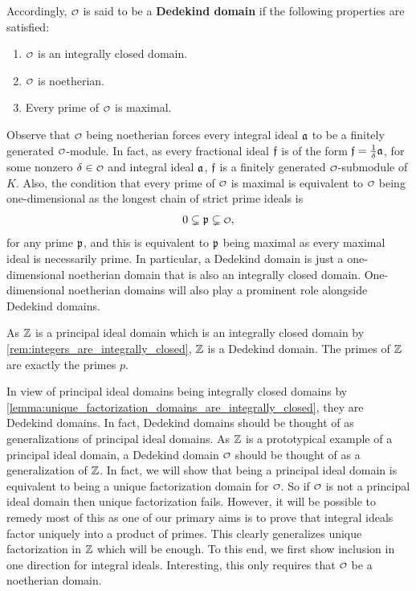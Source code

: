     Accordingly, \(\smc{O}\) is said to be a \textbf{Dedekind domain} if the following properties are satisfied:
    \begin{enumerate}[label*=(\roman*)]
      \item \(\smc{O}\) is an integrally closed domain.
      \item \(\smc{O}\) is noetherian.
      \item Every prime of \(\smc{O}\) is maximal.
    \end{enumerate}
    Observe that \(\smc{O}\) being noetherian forces every integral ideal \(\mathfrak{a}\) to be a finitely generated \(\smc{O}\)-module. In fact, as every fractional ideal \(\mathfrak{f}\) is of the form \(\mathfrak{f} = \frac{1}{\delta}\mathfrak{a}\), for some nonzero \(\d \in \smc{O}\) and integral ideal \(\mathfrak{a}\), \(\mathfrak{f}\) is a finitely generated \(\smc{O}\)-submodule of \(K\). Also, the condition that every prime of \(\smc{O}\) is maximal is equivalent to \(\smc{O}\) being one-dimensional as the longest chain of strict prime ideals is
    \[
      0 \subsetneq \mf{p} \subsetneq \smc{O},
    \]
    for any prime \(\mathfrak{p}\), and this is equivalent to \(\mathfrak{p}\) being maximal as every maximal ideal is necessarily prime. In particular, a Dedekind domain is just a one-dimensional noetherian domain that is also an integrally closed domain. One-dimensional noetherian domains will also play a prominent role alongside Dedekind domains.

    \begin{remark}
      As \(\mathbb{Z}\) is a principal ideal domain which is an integrally closed domain by \cref{rem:integers_are_integrally_closed}, \(\mathbb{Z}\) is a Dedekind domain. The primes of \(\mathbb{Z}\) are exactly the primes \(p\).
    \end{remark}
    
    In view of principal ideal domains being integrally closed domains by \cref{lemma:unique_factorization_domains_are_integrally_closed}, they are Dedekind domains. In fact, Dedekind domains should be thought of as generalizations of principal ideal domains. As \(\mathbb{Z}\) is a prototypical example of a principal ideal domain, a Dedekind domain \(\smc{O}\) should be thought of as a generalization of \(\mathbb{Z}\). In fact, we will show that being a principal ideal domain is equivalent to being a unique factorization domain for \(\smc{O}\). So if \(\smc{O}\) is not a principal ideal domain then unique factorization fails. However, it will be possible to remedy most of this as one of our primary aims is to prove that integral ideals factor uniquely into a product of primes. This clearly generalizes unique factorization in \(\mathbb{Z}\) which will be enough. To this end, we first show inclusion in one direction for integral ideals. Interesting, this only requires that \(\smc{O}\) be a noetherian domain.

